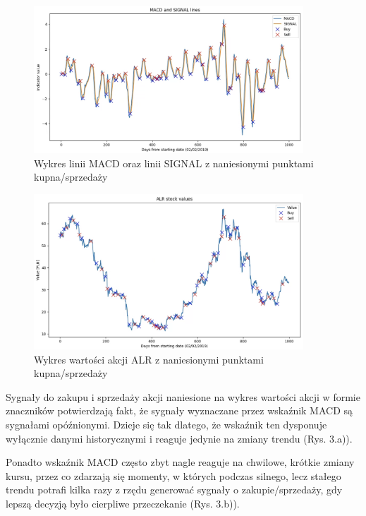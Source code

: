\documentclass{article}
\begin{document}
\begin{figure}[h!]
  \centering
  \includegraphics[width=0.9\textwidth]{macd.png}
  \caption{Wykres linii MACD oraz linii SIGNAL z naniesionymi punktami kupna/sprzedaży}
\end{figure}

\begin{figure}[h!]
  \centering
  \includegraphics[width=0.9\textwidth]{values.png}
  \caption{Wykres wartości akcji ALR z naniesionymi punktami kupna/sprzedaży}
\end{figure}

\newpage

Sygnały do zakupu i sprzedaży akcji naniesione na wykres wartości akcji w formie znaczników potwierdzają fakt, że sygnały wyznaczane przez wskaźnik MACD są sygnałami opóźnionymi. Dzieje się tak dlatego, że wskaźnik ten dysponuje wyłącznie danymi historycznymi i reaguje jedynie na zmiany trendu (Rys. 3.a)). 

Ponadto wskaźnik MACD często zbyt nagle reaguje na chwilowe, krótkie zmiany kursu, przez co zdarzają się momenty, w których podczas silnego, lecz stałego trendu potrafi kilka razy z rzędu generować sygnały o zakupie/sprzedaży, gdy lepszą decyzją było cierpliwe przeczekanie (Rys. 3.b)). 
\end{document}
